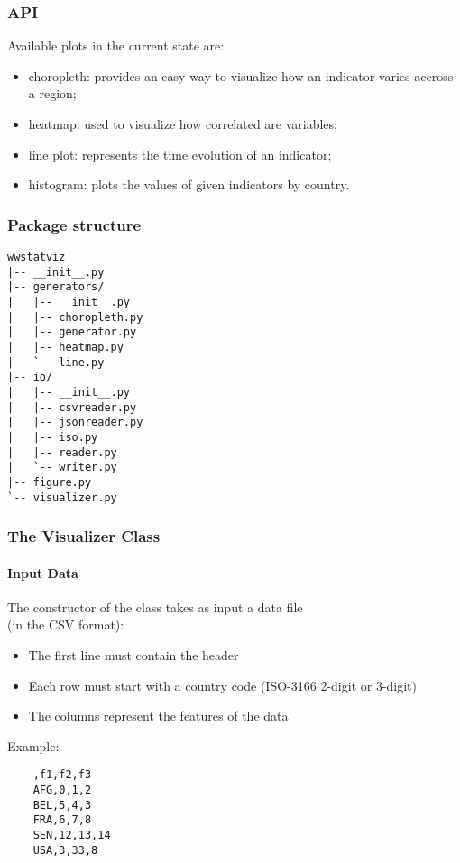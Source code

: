 \begin{frame}
  \frametitle{API}

Available plots in the current state are:
\begin{itemize}
  \item choropleth: provides an easy way to visualize how an indicator varies accross a region;
  \item heatmap: used to visualize how correlated are variables;
  \item line plot: represents the time evolution of an indicator;
  \item histogram: plots the values of given indicators by country.
\end{itemize}
\end{frame}

\begin{frame}[fragile,shrink=30]
  \frametitle{Package structure}
\begin{verbatim}
wwstatviz
|-- __init__.py
|-- generators/
|   |-- __init__.py
|   |-- choropleth.py
|   |-- generator.py
|   |-- heatmap.py
|   `-- line.py
|-- io/
|   |-- __init__.py
|   |-- csvreader.py
|   |-- jsonreader.py
|   |-- iso.py
|   |-- reader.py
|   `-- writer.py
|-- figure.py
`-- visualizer.py
\end{verbatim}
\end{frame}

\begin{frame}[fragile,shrink=10]
  \frametitle{The Visualizer Class}
  \framesubtitle{Input Data}
  
  The constructor of the class takes as input a data file \\
  (in the CSV format):
  \begin{itemize}
    \item The first line must contain the header
    \item Each row must start with a country code (ISO-3166 2-digit or 3-digit)
    \item The columns represent the features of the data
  \end{itemize}
  
  \vspace{5mm}
  
  Example:
  \begin{verbatim}
    ,f1,f2,f3
    AFG,0,1,2
    BEL,5,4,3
    FRA,6,7,8
    SEN,12,13,14
    USA,3,33,8
  \end{verbatim}

\end{frame}

